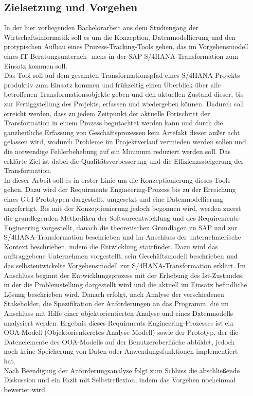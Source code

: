 \subsection{Zielsetzung und Vorgehen}
In der hier vorliegenden Bachelorarbeit aus dem Studiengang der Wirtschaftsinformatik soll es um die Konzeption, Datenmodellierung und den protypischen Aufbau eines Prozess-Tracking-Tools gehen, das im Vorgehensmodell eines IT-Beratungsunterneh- mens in der SAP S/4HANA-Transformation zum Einsatz kommen soll.\\ Das Tool soll auf dem gesamten Transformationspfad eines S/4HANA-Projekts produktiv zum Einsatz kommen und frühzeitig einen Überblick über alle betroffenen Transformationsobjekte geben und den aktuellen Zustand dieser, bis zur Fertiggstellung des Projekts, erfassen und wiedergeben können. Dadurch soll erreicht werden, dass zu jedem Zeitpunkt der aktuelle Fortschritt der Transformation in einem Prozess begutachtet werden kann und durch die ganzheitliche Erfassung von Geschäftsprozessen kein Artefakt dieser außer acht gelassen wird, wodurch Probleme im Projektverlauf vermieden werden sollen und die notwendige Fehlerbehebung auf ein Minimum reduziert werden soll. Das erklärte Ziel ist dabei die Qualitätsverbesserung und die Effizienzssteigerung der Transformation.\\
In dieser Arbeit soll es in erster Linie um die Konzeptionierung dieses Tools gehen. Dazu wird der Requirments Engineering-Prozess bis zu der Erreichung eines GUI-Prototypen dargestellt, umgesetzt und eine Datenmodellierung angefertigt. Bis mit der Konzeptionierung jedoch begonnen wird, werden zuerst die grundlegenden Methodiken der Softwareentwicklung und des Requirements-Engineering vorgestellt, danach die theoretischen Grundlagen zu SAP und zur S/4HANA-Transformation beschrieben und im Anschluss der unternehmerische Kontext beschrieben, indem die Entwicklung stattfindet. Dazu wird das auftraggebene Unternehmen vorgestellt, sein Geschäftsmodell beschrieben und das selbstentwickelte Vorgehensmodell zur S/4HANA-Transformation erklärt. Im Anschluss beginnt der Entwicklungsprozess mit der Erhebung des Ist-Zustandes, in der die Problemstellung dargestellt wird und die aktuell im Einsatz befindliche Lösung beschrieben wird. Danach erfolgt, nach Analyse der verschiedenen Stakeholder, die Spezifikation der Anforderungen an das Programm, die im Anschluss mit Hilfe einer objektorientierten Analyse und eines Datenmodells analysiert werden. Ergebnis dieses Requirments Engineering-Prozesses ist ein OOA-Modell (Objektorientieretes-Analyse-Modell) sowie der Prototyp, der die Datenelemente des OOA-Modells auf der Benutzeroberfläche abbildet, jedoch noch keine Speicherung von Daten oder Anwendungsfunktionen implementiert hat.\\Nach Beendigung der Anforderungsanalyse folgt zum Schluss die abschließende Diskussion und ein Fazit mit Selbstreflexion, indem das Vorgehen nocheinmal bewertet wird. 

